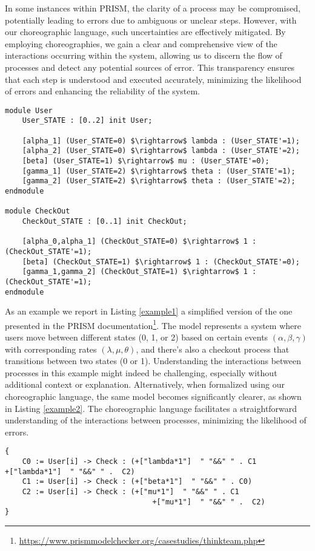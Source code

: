 
In some instances within PRISM, the clarity of a process may be compromised, potentially leading to errors due to ambiguous or unclear steps. However, with our choreographic language, such uncertainties are effectively mitigated. By employing choreographies, we gain a clear and comprehensive view of the interactions occurring within the system, allowing us to discern the flow of processes and detect any potential sources of error. This transparency ensures that each step is understood and executed accurately, minimizing the likelihood of errors and enhancing the reliability of the system.
\begin{lstlisting}[style=prism-color,caption={A PRISM example},captionpos=b,label={example1}]
module User
	User_STATE : [0..2] init User;

	[alpha_1] (User_STATE=0) $\rightarrow$ lambda : (User_STATE'=1);
	[alpha_2] (User_STATE=0) $\rightarrow$ lambda : (User_STATE'=2);
	[beta] (User_STATE=1) $\rightarrow$ mu : (User_STATE'=0);
	[gamma_1] (User_STATE=2) $\rightarrow$ theta : (User_STATE'=1);
	[gamma_2] (User_STATE=2) $\rightarrow$ theta : (User_STATE'=2);
endmodule

module CheckOut
	CheckOut_STATE : [0..1] init CheckOut;

	[alpha_0,alpha_1] (CheckOut_STATE=0) $\rightarrow$ 1 : (CheckOut_STATE'=1);
	[beta] (CheckOut_STATE=1) $\rightarrow$ 1 : (CheckOut_STATE'=0);
	[gamma_1,gamma_2] (CheckOut_STATE=1) $\rightarrow$ 1 : (CheckOut_STATE'=1);
endmodule
\end{lstlisting}

As an example we report in Listing \ref{example1} a simplified version of the one presented in the PRISM documentation\footnote{\url{https://www.prismmodelchecker.org/casestudies/thinkteam.php}}. The model represents a system where users move between different states (0, 1, or 2) based on certain events $(\alpha, \beta, \gamma)$ with corresponding rates $(\lambda, \mu, \theta)$, and there's also a checkout process that transitions between two states (0 or 1).
Understanding the interactions between processes in this example might indeed be challenging, especially without additional context or explanation. 
Alternatively, when formalized using our choreographic language, the same model becomes significantly clearer, as shown in Listing \ref{example2}. The choreographic language facilitates a straightforward understanding of the interactions between processes, minimizing the likelihood of errors.

\begin{lstlisting}[style=chor-color,caption={Example of Listing \ref{example1} in our choreographic language},captionpos=b,label={example2}]
{
    C0 := User[i] -> Check : (+["lambda*1"]  " "&&" " . C1								+["lambda*1"]  " "&&" " .  C2)
    C1 := User[i] -> Check : (+["beta*1"]  " "&&" " . C0)  
    C2 := User[i] -> Check : (+["mu*1"]  " "&&" " . C1
                                  +["mu*1"]  " "&&" " .  C2)
}
\end{lstlisting}




